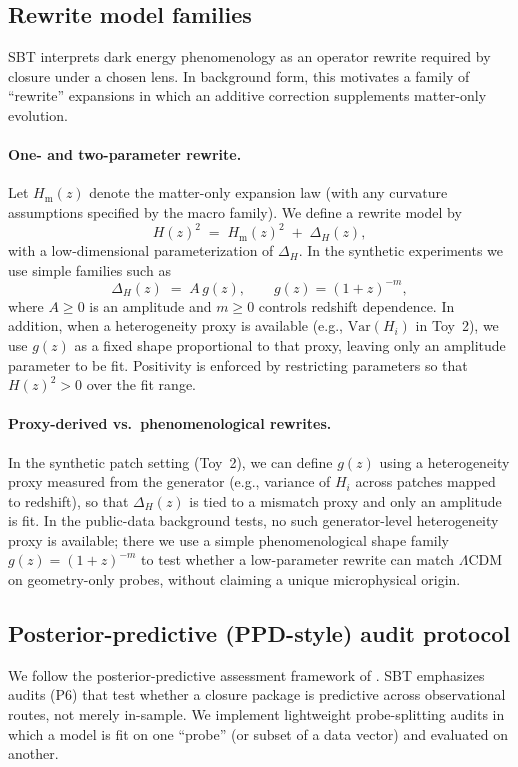 \documentclass[11pt]{article}
\theoremstyle{definition}
\theoremstyle{plain}
\theoremstyle{remark}
\begin{document}
\subsection{Rewrite model families}\label{sec:methods:rewrite}
SBT interprets dark energy phenomenology as an operator rewrite required by closure under a chosen lens.
In background form, this motivates a family of ``rewrite'' expansions in which an additive correction supplements matter-only evolution.

\paragraph{One- and two-parameter rewrite.}
Let $H_{\mathrm{m}}(z)$ denote the matter-only expansion law (with any curvature assumptions specified by the macro family).
We define a rewrite model by
\begin{equation}
H(z)^2 \;=\; H_{\mathrm{m}}(z)^2 \;+\; \Delta_H(z),
\label{eq:rewrite_general}
\end{equation}
with a low-dimensional parameterization of $\Delta_H$.
In the synthetic experiments we use simple families such as
\begin{equation}
\Delta_H(z) \;=\; A\,g(z),\qquad g(z)=(1+z)^{-m},
\label{eq:rewrite_powerlaw}
\end{equation}
where $A\ge 0$ is an amplitude and $m\ge 0$ controls redshift dependence.
In addition, when a heterogeneity proxy is available (e.g., $\mathrm{Var}(H_i)$ in Toy~2), we use $g(z)$ as a fixed shape proportional to that proxy, leaving only an amplitude parameter to be fit. Positivity is enforced by restricting parameters so that $H(z)^2>0$ over the fit range.

\paragraph{Proxy-derived vs.\ phenomenological rewrites.}
In the synthetic patch setting (Toy~2), we can define $g(z)$ using a heterogeneity proxy measured from the generator (e.g., variance of $H_i$ across patches mapped to redshift), so that $\Delta_H(z)$ is tied to a mismatch proxy and only an amplitude is fit.
In the public-data background tests, no such generator-level heterogeneity proxy is available; there we use a simple phenomenological shape family $g(z)=(1+z)^{-m}$ to test whether a low-parameter rewrite can match $\Lambda$CDM on geometry-only probes, without claiming a unique microphysical origin.

\subsection{Posterior-predictive (PPD-style) audit protocol}\label{sec:methods:ppd}
We follow the posterior-predictive assessment framework of \cite{Gelman1996PPD}.
SBT emphasizes audits (P6) that test whether a closure package is predictive across observational routes, not merely in-sample.
We implement lightweight probe-splitting audits in which a model is fit on one ``probe'' (or subset of a data vector) and evaluated on another.
\end{document}
